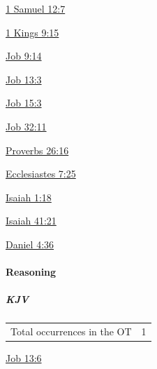 				\begin{compactdesc}
					\item[{\hyperref[1SAMUEL-12-7]{1 Samuel 12:7}}]
					\item[{\hyperref[1KINGS-9-15]{1 Kings 9:15}}]
					\item[{\hyperref[JOB-9-14]{Job 9:14}}]
					\item[{\hyperref[JOB-13-3]{Job 13:3}}]
					\item[{\hyperref[JOB-15-3]{Job 15:3}}]
					\item[{\hyperref[JOB-32-11]{Job 32:11}}]
					\item[{\hyperref[PROVERBS-26-16]{Proverbs 26:16}}] 
					\item[{\hyperref[ECCLESIASTES-7-25]{Ecclesiastes 7:25}}] 
					\item[{\hyperref[ISAIAH-1-18]{Isaiah 1:18}}]
					\item[{\hyperref[ISAIAH-41-21]{Isaiah 41:21}}] 
					\item[{\hyperref[DANIEL-4-36]{Daniel 4:36}}] 
				\end{compactdesc}
				
		\paragraph{Reasoning}
	
			\subparagraph{KJV}
		
				\begin{tabular}{ll}
					Total occurrences in the OT & 1
				\end{tabular}
				
				\begin{compactdesc}
					\item[{\hyperref[JOB-13-6]{Job 13:6}}]
				\end{compactdesc}
			
		
			
